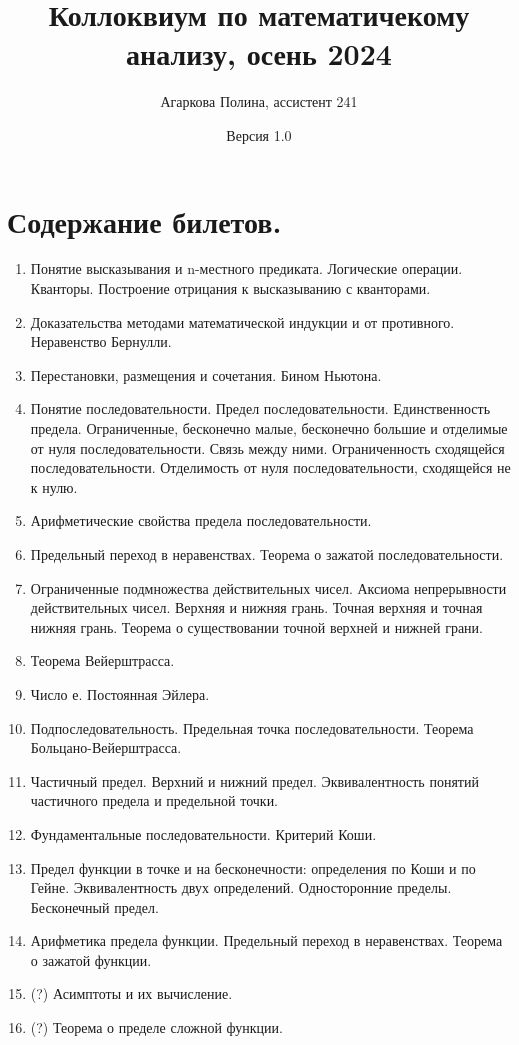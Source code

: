 \documentclass[12pt]{article}
\title{Коллоквиум по математичекому анализу, осень 2024}
\author{Агаркова Полина, ассистент 241}
\date{Версия 1.0}
\begin{document}
\maketitle

\tableofcontents %

\newpage %

\section*{Содержание билетов.}
\begin{enumerate}
    \item Понятие высказывания и n-местного предиката. Логические операции. Кванторы. Построение отрицания к высказыванию с кванторами. 
    \item Доказательства методами математической индукции и от противного. Неравенство Бернулли. 
    \item Перестановки, размещения и сочетания. Бином Ньютона. 
    \item Понятие последовательности. Предел последовательности. Единственность предела. Ограниченные, бесконечно малые, бесконечно большие  и отделимые от нуля последовательности. Связь между ними. Ограниченность сходящейся последовательности. Отделимость от нуля последовательности, сходящейся не к нулю.
    \item Арифметические свойства предела последовательности.
    \item Предельный переход в неравенствах. Теорема о зажатой последовательности.
    \item Ограниченные подмножества действительных чисел. Аксиома непрерывности действительных чисел. Верхняя и нижняя грань. Точная верхняя и точная нижняя грань. Теорема о существовании точной верхней и нижней грани.
    \item Теорема Вейерштрасса.
    \item Число е. Постоянная Эйлера.
    \item Подпоследовательность. Предельная точка последовательности. Теорема Больцано-Вейерштрасса.
    \item Частичный предел. Верхний и нижний предел. Эквивалентность понятий частичного предела и предельной точки.
    \item Фундаментальные последовательности. Критерий Коши.
    \item Предел функции в точке и на бесконечности: определения по Коши и по Гейне. Эквивалентность двух определений. Односторонние пределы. Бесконечный предел.
    \item Арифметика предела функции. Предельный переход в неравенствах. Теорема о зажатой функции. 
    \item (?) Асимптоты и их вычисление. 
    \item (?) Теорема о пределе сложной функции.
\end{enumerate}
\end{document}
